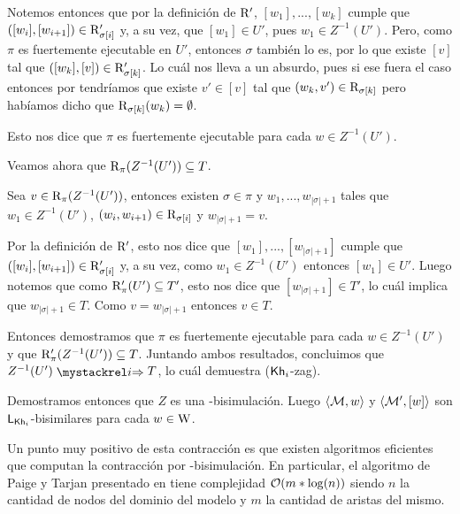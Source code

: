 \begin{demostracion}
\begin{itemize}
        Notemos entonces que por la definición de $\mathrm{R}'$, $[w_1],...,[w_k]$ cumple que $([w_i],[w_{i+1}]) \in \mathrm{R}'_{\sigma[i]}$ y, a su vez, 
        que $[w_1] \in U'$, pues $w_1 \in Z^{-1}(U')$. Pero, como $\pi$ es fuertemente ejecutable en $U'$, entonces $\sigma$ también lo es, por lo que 
        existe $[v]$ tal que $([w_k],[v]) \in \mathrm{R}'_{\sigma[k]}$. Lo cuál nos lleva a un absurdo, pues si ese fuera el caso entonces por 
         tendríamos que existe $v' \in [v]$ tal que $(w_k,v') \in \mathrm{R}_{\sigma[k]}$ pero habíamos dicho que 
        $\mathrm{R}_{\sigma[k]}(w_k) = \emptyset$.

        Esto nos dice que $\pi$ es fuertemente ejecutable para cada $w \in Z^{-1}(U')$.

        Veamos ahora que $\mathrm{R}_\pi(Z^{-1}(U')) \subseteq T$.

        Sea $v \in \mathrm{R}_\pi(Z^{-1}(U'))$, entonces existen $\sigma \in \pi$ y $w_1,...,w_{|\sigma|+1}$ tales que 
        $w_1 \in Z^{-1}(U')$, $(w_i,w_{i+1}) \in \mathrm{R}_{\sigma[i]}$ y $w_{|\sigma|+1} = v$. 

        Por la definición de $\mathrm{R}'$, esto nos dice que $[w_1],...,[w_{|\sigma|+1}]$ cumple que $([w_i],[w_{i+1}]) \in \mathrm{R}'_{\sigma[i]}$ 
        y, a su vez, como $w_1 \in Z^{-1}(U')$ entonces $[w_1] \in U'$. Luego notemos que como $\mathrm{R}'_\pi(U') \subseteq T'$, esto nos dice que 
        $[w_{|\sigma|+1}] \in T'$, lo cuál implica que $w_{|\sigma|+1} \in T$. Como $v = w_{|\sigma|+1}$ entonces $v \in T$. 

        Entonces demostramos que $\pi$ es fuertemente ejecutable para cada $w \in Z^{-1}(U')$ y que $\mathrm{R}'_\pi(Z^{-1}(U')) \subseteq T$. 
        Juntando ambos resultados, concluimos que $Z^{-1}(U') \ultsExecAgi T$, lo cuál demuestra ($\mathsf{Kh}_i$-zag).
    \end{itemize}
    Demostramos entonces que $Z$ es una \KHilogic-bisimulación. Luego $\langle \mathcal{M},w \rangle$ y $\langle \mathcal{M}',[w] \rangle$ son $\mathsf{L}_{\mathsf{Kh}_i}$-bisimilares 
    para cada $w \in \mathrm{W}$.
\end{demostracion}

Un punto muy positivo de esta contracción es que existen algoritmos eficientes que computan la contracción por \bml-bisimulación. En particular, 
el algoritmo de Paige y Tarjan presentado en \cite[`Partición Relacional más Gruesa']{Paige&TarjanContraction} tiene complejidad $\mathcal{O}(m*\log(n))$ siendo $n$ la cantidad de nodos del dominio del modelo y 
$m$ la cantidad de aristas del mismo.


